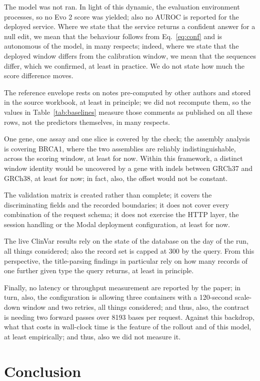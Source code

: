 \documentclass[10pt,journal]{IEEEtran}
\begin{document}
The model was not ran. In light of this dynamic, the evaluation environment processes, so no Evo 2 score was yielded; also no AUROC is reported for the deployed service. Where we state that the service returns a confident answer for a null edit, we mean that the behaviour follows from Eq.~\eqref{eq:conf} and is autonomous of the model, in many respects; indeed, where we state that the deployed window differs from the calibration window, we mean that the sequences differ, which we confirmed, at least in practice. We do not state how much the score difference moves.

The reference envelope rests on notes pre-computed by other authors and stored in the source workbook, at least in principle; we did not recompute them, so the values in Table~\ref{tab:baselines} measure those comments as published on all these rows, not the predictors themselves, in many respects.

One gene, one assay and one slice is covered by the check; the assembly analysis is covering BRCA1, where the two assemblies are reliably indistinguishable, across the scoring window, at least for now. Within this framework, a distinct window identity would be uncovered by a gene with indels between GRCh37 and GRCh38, at least for now; in fact, also, the offset would not be constant.

The validation matrix is created rather than complete; it covers the discriminating fields and the recorded boundaries; it does not cover every combination of the request schema; it does not exercise the HTTP layer, the session handling or the Modal deployment configuration, at least for now.

The live ClinVar results rely on the state of the database on the day of the run, all things considered; also the record set is capped at 300 by the query. From this perspective, the title-parsing findings in particular rely on how many records of one further given type the query returns, at least in principle.

Finally, no latency or throughput measurement are reported by the paper; in turn, also, the configuration is allowing three containers with a 120-second scale-down window and two retries, all things considered; and thus, also, the contract is needing two forward passes over 8193 bases per request. Against this backdrop, what that costs in wall-clock time is the feature of the rollout and of this model, at least empirically; and thus, also we did not measure it.

\section{Conclusion}
\label{sec:conclusion}
\end{document}
